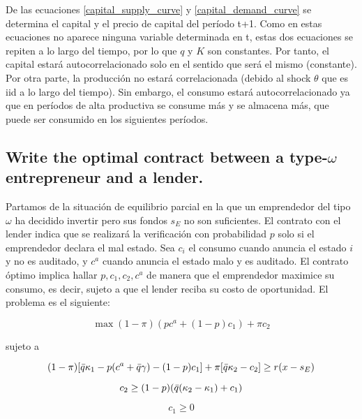 \documentclass[12pt]{article}
\begin{document}
De las ecuaciones \eqref{capital_supply_curve} y \eqref{capital_demand_curve} se determina el capital y el precio de capital del período t+1. Como en estas ecuaciones no aparece ninguna variable determinada en t, estas dos ecuaciones se repiten a lo largo del tiempo, por lo que $q$ y $K$ son constantes. Por tanto, el capital estará autocorrelacionado solo en el sentido que será el mismo (constante). Por otra parte, la producción no estará correlacionada (debido al shock $\theta$ que es iid a lo largo del tiempo). Sin embargo, el consumo estará autocorrelacionado ya que en períodos de alta productiva se consume más y se almacena más, que puede ser consumido en los siguientes períodos.

\noindent\makebox[\linewidth]{\rule{\paperwidth}{0.4pt}}

\subsection{Write the optimal contract between a type-$\omega$ entrepreneur and a lender.}
Partamos de la situación de equilibrio parcial en la que un emprendedor del tipo $\omega$ ha decidido invertir pero sus fondos $s_E$ no son suficientes. El contrato con el lender indica que se realizará la verificación con probabilidad $p$ solo si el emprendedor declara el mal estado. Sea $c_i$ el consumo cuando anuncia el estado $i$ y no es auditado, y $c^a$ cuando anuncia el estado malo y es auditado. El contrato óptimo implica hallar ${p, c_1, c_2, c^a}$ de manera que el emprendedor maximice su consumo, es decir, sujeto a que el lender reciba su costo de oportunidad. El problema es el siguiente:

\begin{equation}
    \max (1-\pi)(p c^a + (1-p)c_1) + \pi c_2
\end{equation}

sujeto a

\begin{equation}
\label{expected_payoff_lender}
    (1- \pi)[\Bar{q}\kappa_1 - p(c^a + \Bar{q}\gamma) - (1-p)c_1] + \pi[\Bar{q}\kappa_2-c_2] \geq r(x-s_E)
\end{equation}

\begin{equation}
\label{truth_telling_constraint}
    c_2 \geq (1-p)(\Bar{q}(\kappa_2 - \kappa_1) + c_1)
\end{equation}

\begin{equation}
\label{limited_liability_1}
    c_1 \geq 0
\end{equation}
\end{document}

